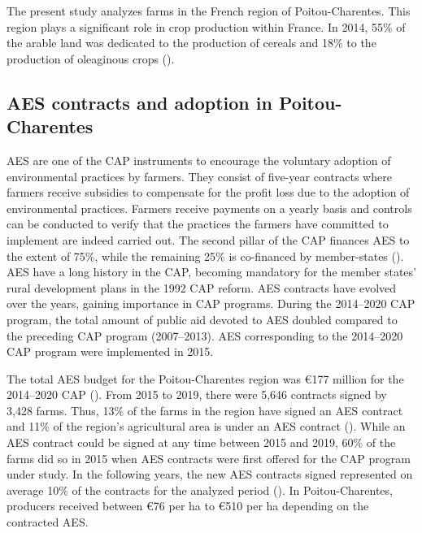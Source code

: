 \begin{Article}
\begin{refsection}[Lassalas]
The present study analyzes farms in the French region of
Poitou-Charentes. This region plays a significant role in crop
production within France. In 2014, 55\% of the arable land was dedicated
to the production of cereals and 18\% to the production of oleaginous crops (\textcite{agreste2015}).

\subsection{AES contracts and adoption in Poitou-Charentes}

AES are one of the CAP instruments to encourage the voluntary adoption
of environmental practices by farmers. They consist of five-year
contracts where farmers receive subsidies to compensate for the profit
loss due to the adoption of environmental practices. Farmers receive
payments on a yearly basis and controls can be conducted to verify that
the practices the farmers have committed to implement are indeed
carried out. The second pillar of the CAP finances AES to the extent of
75\%, while the remaining 25\% is co-financed by member-states
(\textcite{ministere_agriculture_2020}). AES have a long history in the CAP, becoming
mandatory for the member states' rural development plans in the 1992 CAP
reform. AES contracts have evolved over the years, gaining importance in
CAP programs. During the 2014--2020 CAP program, the total amount of
public aid devoted to AES doubled compared to the preceding CAP program
(2007--2013). AES corresponding to the 2014--2020 CAP program were
implemented in 2015.

The total AES budget for the Poitou-Charentes region was €177 million
for the 2014--2020 CAP (\textcite{region_nouvelle-aquitaine_2020}). From 2015
to 2019, there were 5,646 contracts signed by 3,428 farms. Thus, 13\% of
the farms in the region have signed an AES contract and 11\% of the region's
agricultural area is under an AES contract (\textcite{region_nouvelle-aquitaine_2020}). While an AES contract could be signed at
any time between 2015 and 2019, 60\% of the farms did so in 2015 when
AES contracts were first offered for the CAP program under study. In the
following years, the new AES contracts signed represented on average
10\% of the contracts for the analyzed period (\textcite{region_nouvelle-aquitaine_2020}). In Poitou-Charentes, producers received between €76 per ha
to €510 per ha depending on the contracted AES.


\end{refsection}
\end{Article}
